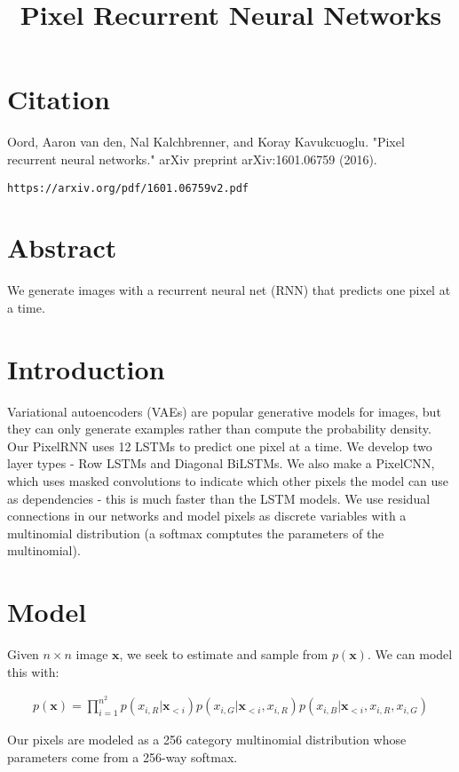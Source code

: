 \documentclass[a4paper]{article}
\title{Pixel Recurrent Neural Networks}
\date{}
\begin{document}
\maketitle

\section{Citation}
Oord, Aaron van den, Nal Kalchbrenner, and Koray Kavukcuoglu. "Pixel recurrent neural networks." arXiv preprint arXiv:1601.06759 (2016).

\begin{verbatim}
https://arxiv.org/pdf/1601.06759v2.pdf
\end{verbatim}

\section{Abstract}
We generate images with a recurrent neural net (RNN) that predicts one pixel at
a time.

\section{Introduction}
Variational autoencoders (VAEs) are popular generative models for images,
but they can only generate examples rather than compute the probability
density. Our PixelRNN uses 12 LSTMs to predict one pixel at a time. We develop
two layer types - Row LSTMs and Diagonal BiLSTMs. We also make a PixelCNN,
which uses masked convolutions to indicate which other pixels the model can use
as dependencies - this is much faster than the LSTM models. We use residual
connections in our networks and model pixels as discrete variables with
a multinomial distribution (a softmax comptutes the parameters of the
multinomial).

\section{Model}
Given $n \times n$ image $\bm{x}$, we seek to estimate and sample from
$p(\bm{x})$. We can model this with:

\begin{align}
  p(\bm{x}) = \prod_{i=1}^{n^2}{
    p(x_{i, R} | \bm{x}_{<i}) p(x_{i, G} | \bm{x}_{<i}, x_{i, R})
    p(x_{i, B} | \bm{x}_{<i}, x_{i, R}, x_{i, G})
  }
\end{align}

Our pixels are modeled as a 256 category multinomial distribution whose
parameters come from a 256-way softmax.
\end{document}
